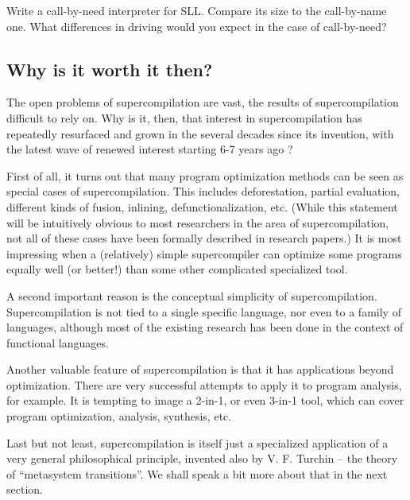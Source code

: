 \begin{exercise}
Write a call-by-need interpreter for SLL. 
Compare its size to the call-by-name one.
What differences in driving would you expect in the case of call-by-need?
\end{exercise}

\subsection{Why is it worth it then?}

The open problems of supercompilation are vast, the results of supercompilation difficult to rely on.
Why is it, then, that interest in supercompilation has repeatedly 
resurfaced and grown in the several decades since its invention,
with the latest wave of renewed interest starting 6-7 years ago 
\cite{Lisitsa2005Towards,Mitchell2007HaskellSCP,Bolingbroke2010Eval,Jonsson2011Phd,Klyuchnikov2009Proving,Reich2010Reduceron,Bolingbroke2011Scp2}?

First of all, it turns out that many program optimization methods can be
seen as special cases of supercompilation.
This includes deforestation, partial evaluation, different kinds of fusion,
inlining, defunctionalization, etc. 
(While this statement will be intuitively obvious to most researchers in the 
area of supercompilation, not all of these cases have been formally
described in research papers.)
It is most impressing when a (relatively) simple supercompiler
can optimize some programs equally well (or better!) than some 
other complicated specialized tool.

A second important reason is the conceptual simplicity of supercompilation.
Supercompilation is not tied to a single specific language, nor even to a family
of languages, although most of the existing research has been done
in the context of functional languages.

Another valuable feature of supercompilation is that it has applications
beyond optimization. 
There are very successful attempts to apply it to program analysis, for example. 
It is tempting to image a 2-in-1, or even 3-in-1 tool,
which can cover program optimization, analysis, synthesis, etc.

Last but not least, supercompilation is itself just a specialized application
of a very general philosophical principle, invented also by V. F. Turchin --
the theory of ``metasystem transitions''. We shall speak a bit more
about that in the next section.
